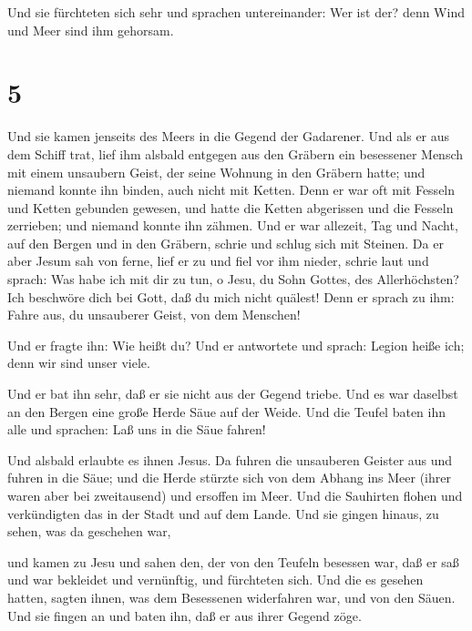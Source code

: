  Und sie fürchteten sich sehr und sprachen untereinander:
Wer ist der? denn Wind und Meer sind ihm gehorsam.

\hypertarget{section-4}{%
\section{5}\label{section-4}}

 Und sie kamen jenseits des Meers in die Gegend der
Gadarener.  Und als er aus dem Schiff trat, lief ihm alsbald
entgegen aus den Gräbern ein besessener Mensch mit einem unsaubern
Geist,  der seine Wohnung in den Gräbern hatte; und niemand
konnte ihn binden, auch nicht mit Ketten.  Denn er war oft
mit Fesseln und Ketten gebunden gewesen, und hatte die Ketten abgerissen
und die Fesseln zerrieben; und niemand konnte ihn zähmen. 
Und er war allezeit, Tag und Nacht, auf den Bergen und in den Gräbern,
schrie und schlug sich mit Steinen.  Da er aber Jesum sah
von ferne, lief er zu und fiel vor ihm nieder, schrie laut und sprach:
 Was habe ich mit dir zu tun, o Jesu, du Sohn Gottes, des
Allerhöchsten? Ich beschwöre dich bei Gott, daß du mich nicht quälest!
 Denn er sprach zu ihm: Fahre aus, du unsauberer Geist, von
dem Menschen!

 Und er fragte ihn: Wie heißt du? Und er antwortete und
sprach: Legion heiße ich; denn wir sind unser viele.

 Und er bat ihn sehr, daß er sie nicht aus der Gegend
triebe.  Und es war daselbst an den Bergen eine große Herde
Säue auf der Weide.  Und die Teufel baten ihn alle und
sprachen: Laß uns in die Säue fahren!

 Und alsbald erlaubte es ihnen Jesus. Da fuhren die
unsauberen Geister aus und fuhren in die Säue; und die Herde stürzte
sich von dem Abhang ins Meer (ihrer waren aber bei zweitausend) und
ersoffen im Meer.  Und die Sauhirten flohen und
verkündigten das in der Stadt und auf dem Lande. Und sie gingen hinaus,
zu sehen, was da geschehen war,

 und kamen zu Jesu und sahen den, der von den Teufeln
besessen war, daß er saß und war bekleidet und vernünftig, und
fürchteten sich.  Und die es gesehen hatten, sagten ihnen,
was dem Besessenen widerfahren war, und von den Säuen.  Und
sie fingen an und baten ihn, daß er aus ihrer Gegend zöge.

